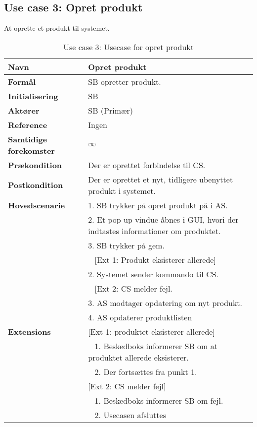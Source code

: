 \subsection{Use case 3: Opret produkt} \label{prodkast}
At oprette et produkt til systemet.



\begin{table}[H]
\begin{tabularx}{\textwidth}{|l|X|}
\hline
\textbf{Navn}					& Opret produkt \\\hline
\textbf{Formål}					& \gls{SB} opretter produkt. \\\hline
\textbf{Initialisering}			& \gls{SB} \\\hline
\textbf{Aktører}				& \gls{SB} (Primær)\\\hline
\textbf{Reference}				& Ingen \\\hline
								
\textbf{Samtidige forekomster}	& $\infty$ \\\hline
\textbf{Prækondition}			& Der er oprettet forbindelse til \gls{CS}.
\\\hline
\textbf{Postkondition}			& Der er oprettet et nyt, tidligere ubenyttet produkt i systemet.
\\\hline
\textbf{Hovedscenarie}			& 1. \gls{SB} trykker på opret produkt på i \gls{AS}.\\												& 2. Et pop up vindue åbnes i \gls{GUI}, hvori der indtastes informationer om produktet.\\
								& 3. \gls{SB} trykker på gem.\\
								& ~ [Ext 1: Produkt eksisterer allerede] \\
								& 2. Systemet sender kommando til \gls{CS}.\\
								& ~ [Ext 2: \gls{CS} melder fejl.\\
								& 3. \gls{AS} modtager opdatering om nyt produkt. \\
								& 4. \gls{AS} opdaterer produktlisten \\\hline

\textbf{Extensions}						
								& [Ext 1: produktet eksisterer allerede] \\
								& ~ 1. Beskedboks informerer \gls{SB} om at produktet allerede eksisterer.\\
								& ~ 2. Der fortsættes fra punkt 1.\\
									
								& [Ext 2: \gls{CS} melder fejl] \\
								& ~ 1. Beskedboks informerer \gls{SB} om fejl. \\
								& ~ 2. Usecasen afsluttes \\\hline
\end{tabularx}
\caption{Use case 3: Usecase for opret produkt}
\label{tab:UCop}
\end{table}
